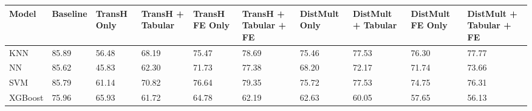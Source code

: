 \begin{tabular}{llllllllll}
\toprule
Model & Baseline & TransH Only & TransH + Tabular & TransH FE Only & TransH + Tabular + FE & DistMult Only & DistMult + Tabular & DistMult FE Only & DistMult + Tabular + FE \\
\midrule
KNN & 85.89 & 56.48 & 68.19 & 75.47 & 78.69 & 75.46 & 77.53 & 76.30 & 77.77 \\
NN & 85.62 & 45.83 & 62.30 & 71.73 & 77.38 & 68.20 & 72.17 & 71.74 & 73.66 \\
SVM & 85.79 & 61.14 & 70.82 & 76.64 & 79.35 & 75.72 & 77.53 & 74.75 & 76.31 \\
XGBoost & 75.96 & 65.93 & 61.72 & 64.78 & 62.19 & 62.63 & 60.05 & 57.65 & 56.13 \\
\bottomrule
\end{tabular}
